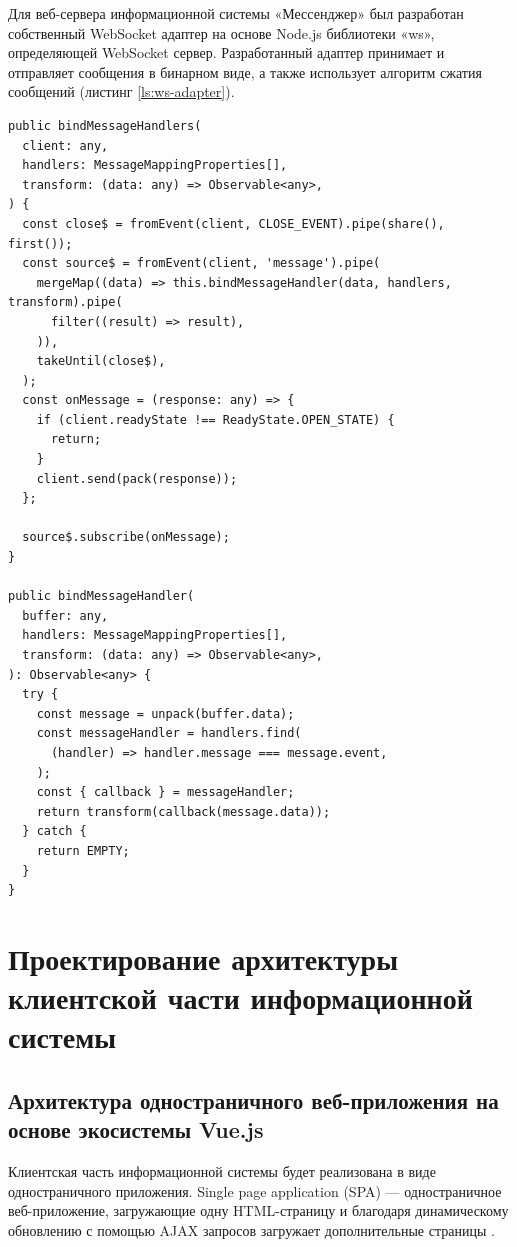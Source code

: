 Для веб-сервера информационной системы «Мессенджер» был разработан собственный WebSocket адаптер на основе Node.js библиотеки «ws», определяющей WebSocket сервер. Разработанный адаптер принимает и отправляет сообщения в бинарном виде, а также использует алгоритм сжатия сообщений (листинг \ref{ls:ws-adapter}).

\begin{lstlisting}[caption={Метод WebSocket адаптера передающий поступающие сообщения на шлюзы Nest.js}, label={ls:ws-adapter}]
public bindMessageHandlers(
  client: any,
  handlers: MessageMappingProperties[],
  transform: (data: any) => Observable<any>,
) {
  const close$ = fromEvent(client, CLOSE_EVENT).pipe(share(), first());
  const source$ = fromEvent(client, 'message').pipe(
    mergeMap((data) => this.bindMessageHandler(data, handlers, transform).pipe(
      filter((result) => result),
    )),
    takeUntil(close$),
  );
  const onMessage = (response: any) => {
    if (client.readyState !== ReadyState.OPEN_STATE) {
      return;
    }
    client.send(pack(response));
  };

  source$.subscribe(onMessage);
}

public bindMessageHandler(
  buffer: any,
  handlers: MessageMappingProperties[],
  transform: (data: any) => Observable<any>,
): Observable<any> {
  try {
    const message = unpack(buffer.data);
    const messageHandler = handlers.find(
      (handler) => handler.message === message.event,
    );
    const { callback } = messageHandler;
    return transform(callback(message.data));
  } catch {
    return EMPTY;
  }
}
\end{lstlisting}

\section{Проектирование архитектуры клиентской части информационной системы}

\subsection{Архитектура одностраничного веб-приложения на основе экосистемы Vue.js}

Клиентская часть информационной системы будет реализована в виде одностраничного приложения. Single page application (SPA) — одностраничное веб-приложение, загружающие одну HTML-страницу и благодаря динамическому обновлению с помощью AJAX запросов загружает дополнительные страницы \cite{SPA}.

